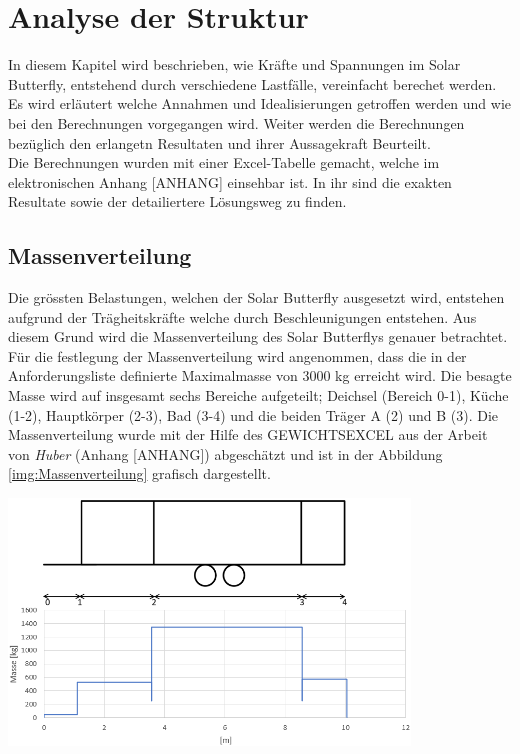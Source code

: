\section{Analyse der Struktur}
\label{Handrechnungen}
In diesem Kapitel wird beschrieben, wie Kräfte und Spannungen im Solar Butterfly, entstehend durch verschiedene Lastfälle, vereinfacht berechet werden. Es wird erläutert welche Annahmen und Idealisierungen getroffen werden und wie bei den Berechnungen vorgegangen wird. Weiter werden die Berechnungen bezüglich den erlangetn Resultaten und ihrer Aussagekraft Beurteilt.\\
Die Berechnungen wurden mit einer Excel-Tabelle gemacht, welche im elektronischen Anhang [ANHANG] einsehbar ist. In ihr sind die exakten Resultate sowie der detailiertere Lösungsweg zu finden.

\subsection{Massenverteilung}
\label{Massenverteilung}
Die grössten Belastungen, welchen der Solar Butterfly ausgesetzt wird, entstehen aufgrund der Trägheitskräfte welche durch Beschleunigungen entstehen. Aus diesem Grund wird die Massenverteilung des Solar Butterflys genauer betrachtet. Für die festlegung der Massenverteilung wird angenommen, dass die in der Anforderungsliste definierte Maximalmasse von 3000 kg erreicht wird. Die besagte Masse wird auf insgesamt sechs Bereiche aufgeteilt; Deichsel (Bereich 0-1), Küche (1-2), Hauptkörper (2-3), Bad (3-4) und die beiden Träger A (2) und B (3). Die Massenverteilung wurde mit der Hilfe des GEWICHTSEXCEL aus der Arbeit von \emph{Huber} (Anhang [ANHANG]) abgeschätzt und ist in der Abbildung \ref{img:Massenverteilung} grafisch dargestellt.

\begin{center}
  \includegraphics[width=0.8\textwidth]{04_Figures/Massenverteilung.png}
  \label{img:Massenverteilung}
\end{center}

